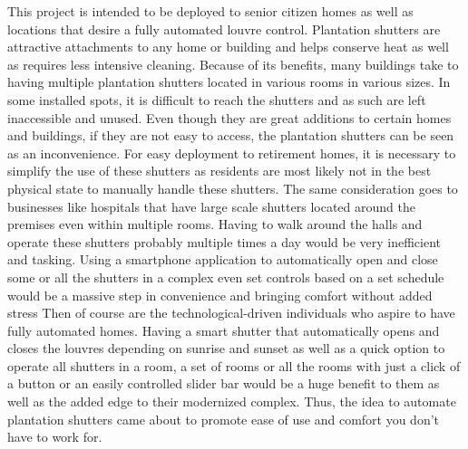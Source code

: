 This project is intended to be deployed to senior citizen homes as well as locations that desire a fully automated louvre control.
Plantation shutters are attractive attachments to any home or building and helps conserve heat as well as requires less intensive cleaning. Because of its benefits, many buildings take to having multiple plantation shutters located in various rooms in various sizes. In some installed spots, it is difficult to reach the shutters and as such are left inaccessible and unused.
 Even though they are great additions to certain homes and buildings, if they are not easy to access, the plantation shutters can be seen as an inconvenience. For easy deployment to retirement homes, it is necessary to simplify the use of these shutters as residents are most likely not in the best physical state to manually handle these shutters.
 The same consideration goes to businesses like hospitals that have large scale shutters located around the premises even within multiple rooms. Having to walk around the halls and operate these shutters probably multiple times a day would be very inefficient and tasking. Using a smartphone application to automatically open and close some or all the shutters in a complex even set controls based on a set schedule would be a massive step in convenience and bringing comfort without added stress
Then of course are the technological-driven individuals who aspire to have fully automated homes. Having a smart shutter that automatically opens and closes the louvres depending on sunrise and sunset as well as a quick option to operate all shutters in a room, a set of rooms or all the rooms with just a click of a button or an easily controlled slider bar would be a huge benefit to them as well as the added edge to their modernized complex.
Thus, the idea to automate plantation shutters came about to promote ease of use and comfort you don't have to work for.
